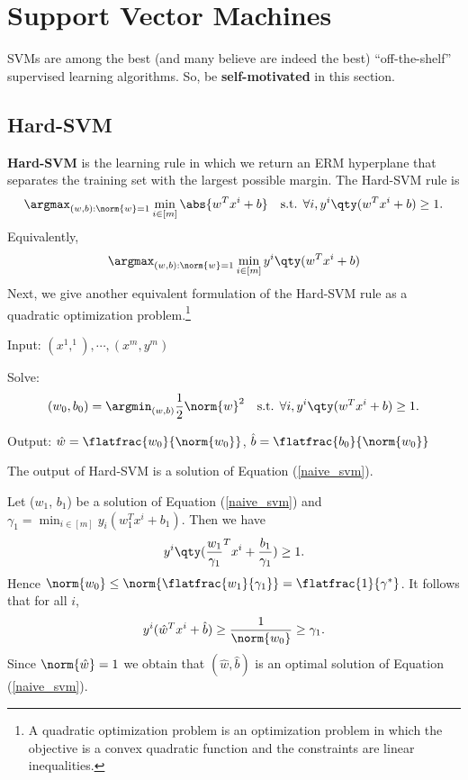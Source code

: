 \section{Support Vector Machines}
SVMs are among the best (and many believe are indeed the best) “off-the-shelf” supervised learning algorithms.
So, be \textbf{self-motivated} in this section.
\subsection{Hard-SVM}
\textbf{Hard-SVM} is the learning rule in which we return an ERM hyperplane that separates the training set with the largest possible margin. The Hard-SVM rule is
\[
	\argmax_{(w,b):\norm{w}=1}\min_{i\in[m]}\abs{w^Tx^i+b}
	\ \ \ 
	\text{s.t. }\forall i, y^i\qty(w^Tx^i+b)\ge 1
.\]
Equivalently,
\begin{equation}
	\argmax_{(w,b):\norm{w}=1}\min_{i\in[m]}y^i\qty(w^Tx^i+b)
	\label{naive_svm}
\end{equation}
Next, we give another equivalent formulation of the Hard-SVM rule as a quadratic optimization problem.\footnote{A quadratic optimization problem is an optimization problem in which the objective is a convex quadratic function and the constraints are linear inequalities.}
\begin{md}
	Input: $(x^1,^1),\cdots,(x^m,y^m)$

	Solve:
	\begin{equation}
		(w_0,b_0)=\argmin_{(w,b)}\frac{1}{2}\norm{w}^2
		\ \ \ 
		\text{s.t. }\forall i, y^i\qty(w^Tx^i+b)\ge 1.
		\label{svm}
	\end{equation}

	Output: $\hat{w}=\flatfrac{w_0}{\norm{w_0}}$, $\hat{b}=\flatfrac{b_0}{\norm{w_0}}$
\end{md}
\begin{lemma}
	The output of Hard-SVM is a solution of Equation (\ref{naive_svm}).
\end{lemma}
\begin{prf}
	Let ($w_1$, $b_1$) be a solution of Equation (\ref{naive_svm}) and $\gamma_1=\min_{i\in[m]}y_i(w_1^{T}x^i+b_1)$. Then we have
	\[
		y^i\qty(\frac{w_1}{\gamma_1}^Tx^i+\frac{b_1}{\gamma_1})\ge 1
	.\] 
	Hence $\norm{w_0}\le \norm{\flatfrac{w_1}{\gamma_1}}=\flatfrac{1}{\gamma^*}$.
	It follows that for all $i$,
	 \[
		 y^i(\hat{w}^Tx^i+\hat{b})\ge \frac{1}{\norm{w_0}}\ge \gamma_1
	.\] 
	Since $\norm{\hat{w}} = 1$ we obtain that $(\hat{w},\hat{b})$ is an optimal solution of Equation (\ref{naive_svm}).
\end{prf}
